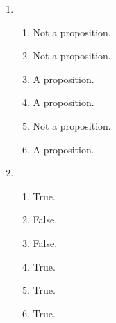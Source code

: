 \documentclass{article}
\begin{document}
      \begin{enumerate} 
        \item
          \begin{enumerate}
            \item Not a proposition.
            \item Not a proposition.
            \item A proposition.
            \item A proposition.
            \item Not a proposition.
            \item A proposition.
          \end{enumerate}
        \item
          \begin{enumerate}
            \item True.
            \item False.
            \item False.
            \item True.
            \item True.
            \item True.
          \end{enumerate}
      \end{enumerate}
      
\end{document}
